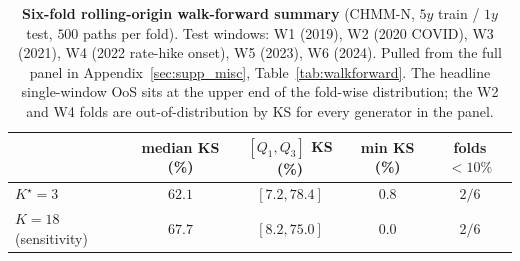 \begin{table}[t]
\centering
\small
\caption{\textbf{Six-fold rolling-origin walk-forward summary} (CHMM-N, $5y$ train / $1y$ test, $500$ paths per fold). Test windows: W1 (2019), W2 (2020 COVID), W3 (2021), W4 (2022 rate-hike onset), W5 (2023), W6 (2024). Pulled from the full panel in Appendix~\ref{sec:supp_misc}, Table~\ref{tab:walkforward}. The headline single-window OoS sits at the upper end of the fold-wise distribution; the W2 and W4 folds are out-of-distribution by KS for every generator in the panel.}
\label{tab:walkforward_body}
\begin{tabular}{l c c c c}
\toprule
            & median KS (\%) & $[Q_1, Q_3]$ KS (\%) & min KS (\%) & folds $< 10\%$ \\
\midrule
$K^\star = 3$           & $62.1$ & $[7.2, 78.4]$  & $0.8$ & $2 / 6$ \\
$K = 18$ (sensitivity)  & $67.7$ & $[8.2, 75.0]$  & $0.0$ & $2 / 6$ \\
\bottomrule
\end{tabular}
\end{table}
